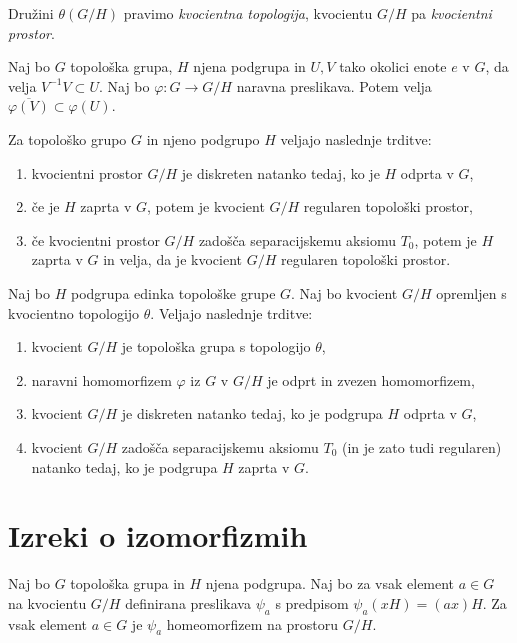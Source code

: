 \documentclass[mat1]{fmfdelo}
\newcommand{\closure}[1]{\overline{#1}}
\begin{document}
Družini $\theta(G/H)$ pravimo \emph{kvocientna topologija}, kvocientu $G/H$ pa \emph{kvocientni prostor}.


\begin{trditev}\label{trd:okolicevkvoc}
Naj bo $G$ topološka grupa, $H$ njena podgrupa in $U, V$ tako okolici enote $e$ v $G$, da velja $V^{-1}V \subset U$. Naj bo $\varphi: G \to G/H$ naravna preslikava. Potem velja $\closure{\varphi(V)} \subset \varphi(U)$.
\end{trditev}

\begin{izrek}
Za topološko grupo $G$ in njeno podgrupo $H$ veljajo naslednje trditve:
\begin{enumerate}
\item kvocientni prostor $G/H$ je diskreten natanko tedaj, ko je $H$ odprta v $G$,
\item če je $H$ zaprta v $G$, potem je kvocient $G/H$ regularen topološki prostor,
\item če kvocientni prostor $G/H$ zadošča separacijskemu aksiomu $T_0$, potem je $H$ zaprta v $G$ in velja, da je kvocient $G/H$ regularen topološki prostor.
\end{enumerate}
\end{izrek}

\begin{izrek}\label{izr:kvocpovzetek}
Naj bo $H$ podgrupa edinka topološke grupe $G$. Naj bo kvocient $G/H$ opremljen s kvocientno topologijo $\theta$. Veljajo naslednje trditve:
\begin{enumerate}
\item kvocient $G/H$ je topološka grupa s topologijo $\theta$,
\item naravni homomorfizem $\varphi$ iz $G$ v $G/H$ je odprt in zvezen homomorfizem,
\item kvocient $G/H$ je diskreten natanko tedaj, ko je podgrupa $H$ odprta v $G$,
\item kvocient $G/H$ zadošča separacijskemu aksiomu $T_0$ (in je zato tudi regularen) natanko tedaj, ko je podgrupa $H$ zaprta v $G$.
\end{enumerate}
\end{izrek}

\section{Izreki o izomorfizmih}

\begin{trditev}\label{trd:homogenkvoc}
	Naj bo $G$ topološka grupa in $H$ njena podgrupa. Naj bo za vsak element $a \in G$ na kvocientu $G/H$ definirana preslikava $\psi_a$ s predpisom $\psi_a(xH) = (ax)H$.
	Za vsak element $a \in G$ je $\psi_a$ homeomorfizem na prostoru $G/H$.
\end{trditev}
\end{document}
